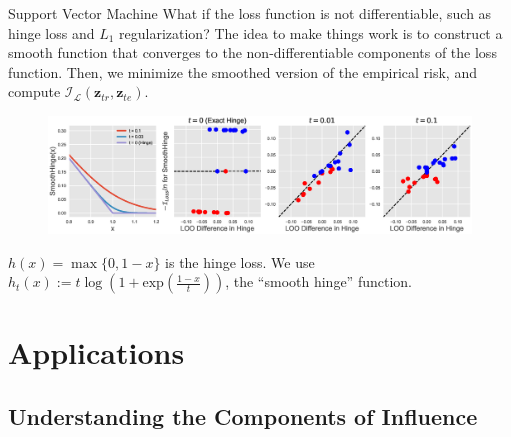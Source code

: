 \documentclass[blue]{beamer}
\newenvironment{figure*}%
{\begin{figure}}
{\end{figure}}
\begin{document}
\begin{frame}{Support Vector Machine}
What if the loss function is not differentiable, such as hinge loss and $L_1$ regularization? The idea to make things work is to construct a smooth function that converges to the non-differentiable components of the loss function. Then, we minimize the smoothed version of the empirical risk, and compute $\mathcal{I}_{\mathcal{L}}(\bm{z}_{tr}, \bm{z}_{te})$.

\begin{figure}
\vskip 0.0in
\begin{center}
\centerline{\includegraphics[width=1.0\columnwidth]{fig-svm}}
\vskip -0.1in
\label{fig_svm}
\end{center}
\vskip -0.2in
\end{figure} 

   $h(x) = \max\{0, 1-x\}$ is the hinge loss. We use $h_t(x) := t\log(1+\text{exp}(\frac{1-x}{t}))$, the ``smooth hinge'' function.
\end{frame}


\section{Applications}

\subsection{Understanding the Components of Influence}
\end{document}
